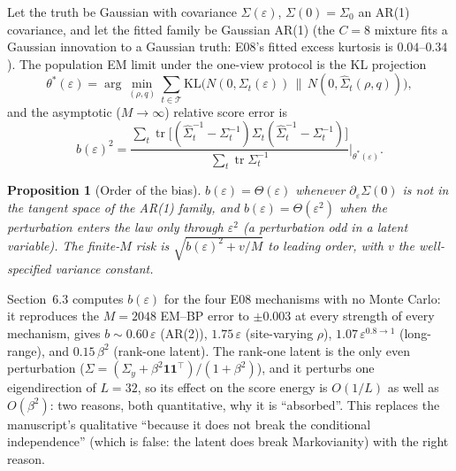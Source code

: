 \documentclass[11pt,a4paper]{article}
\newtheorem{proposition}[theorem]{Proposition}
\theoremstyle{definition}
\theoremstyle{remark}
\begin{document}
Let the truth be Gaussian with covariance $\Sigma(\varepsilon)$, $\Sigma(0)=\Sigma_0$ an AR(1) covariance, and let the fitted family be Gaussian AR(1) (the $C=8$ mixture fits a Gaussian innovation to a Gaussian truth: E08's fitted excess kurtosis is $0.04$--$0.34$). The population EM limit under the one-view protocol is the KL projection
\[
 \theta^\ast(\varepsilon)=\arg\min_{(\rho,q)}\sum_{t\in\mathcal T}\mathrm{KL}\bigl(N(0,\Sigma_t(\varepsilon))\,\|\,N(0,\hat\Sigma_t(\rho,q))\bigr),
\]
and the asymptotic ($M\to\infty$) relative score error is
\[
 b(\varepsilon)^2=\frac{\sum_t\operatorname{tr}\bigl[(\hat\Sigma_t^{-1}-\Sigma_t^{-1})\Sigma_t(\hat\Sigma_t^{-1}-\Sigma_t^{-1})\bigr]}{\sum_t\operatorname{tr}\Sigma_t^{-1}}\Bigg|_{\theta^\ast(\varepsilon)} .
\]
\begin{proposition}[Order of the bias]
\label{prop:bias}
$b(\varepsilon)=\Theta(\varepsilon)$ whenever $\partial_\varepsilon\Sigma(0)$ is not in the tangent space of the AR(1) family, and $b(\varepsilon)=\Theta(\varepsilon^2)$ when the perturbation enters the law only through $\varepsilon^2$ (a perturbation odd in a latent variable). The finite-$M$ risk is $\sqrt{b(\varepsilon)^2+v/M}$ to leading order, with $v$ the well-specified variance constant.
\end{proposition}
\noindent Section~6.3 computes $b(\varepsilon)$ for the four E08 mechanisms with no Monte Carlo: it reproduces the $M=2048$ EM--BP error to $\pm0.003$ at every strength of every mechanism, gives $b\sim0.60\,\varepsilon$ (AR(2)), $1.75\,\varepsilon$ (site-varying $\rho$), $1.07\,\varepsilon^{0.8\to1}$ (long-range), and $0.15\,\beta^2$ (rank-one latent). The rank-one latent is the only even perturbation ($\Sigma=(\Sigma_y+\beta^2\mathbf 1\mathbf 1^\top)/(1+\beta^2)$), and it perturbs one eigendirection of $L=32$, so its effect on the score energy is $O(1/L)$ as well as $O(\beta^2)$: two reasons, both quantitative, why it is ``absorbed''. This replaces the manuscript's qualitative ``because it does not break the conditional independence'' (which is false: the latent does break Markovianity) with the right reason.









\end{document}
